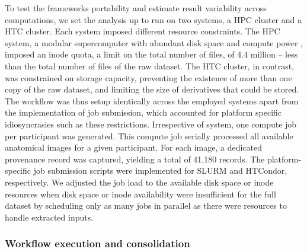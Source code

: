To test the frameworks portability and estimate result variability across computations, we set the analysis up to run on two systems, a \gls{HPC} cluster and a \gls{HTC} cluster.
Each system imposed different resource constraints.
The \gls{HPC} system, a modular supercomputer with abundant disk space and compute power \citep{krause2018jureca}, imposed an inode quota, a limit on the total number of files, of 4.4 million – less than the total number of files of the raw dataset.
The \gls{HTC} cluster, in contrast, was constrained on storage capacity, preventing the existence of more than one copy of the raw dataset, and limiting the size of derivatives that could be stored.
The workflow was thus setup identically across the employed systems apart from the implementation of job submission, which accounted for platform specific idiosyncrasies such as these restrictions.
Irrespective of system, one compute job per participant was generated.
This compute job serially processed all available anatomical images for a given participant.
For each image, a dedicated provenance record was captured, yielding a total of 41,180 records.
The platform-specific job submission scripts were implemented for SLURM and HTCondor, respectively.
We adjusted the job load to the available disk space or inode resources when disk space or inode availability were insufficient for the full dataset by scheduling only as many jobs in parallel as there were resources to handle extracted inputs.

\subsubsection{Workflow execution and consolidation}

